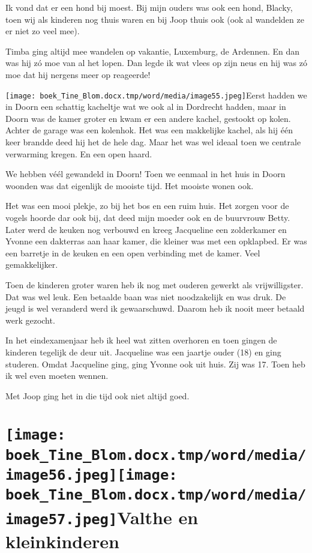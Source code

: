 \documentclass{scrbook}
\begin{document}
{Ik vond dat er een hond bij moest. Bij mijn ouders was ook een hond, Blacky, toen wij als kinderen nog thuis waren en bij Joop thuis ook (ook al wandelden ze er niet zo veel mee).

Timba ging altijd mee wandelen op vakantie, Luxemburg, de Ardennen. En dan was hij z\'{o} moe van al het lopen. Dan legde ik wat vlees op zijn neus en hij was z\'{o} moe dat hij nergens meer op reageerde!

\texttt{[image: boek\_Tine\_Blom.docx.tmp/word/media/image55.jpeg]}Eerst hadden we in Doorn een schattig kacheltje wat we ook al in Dordrecht hadden, maar in Doorn was de kamer groter en kwam er een andere kachel, gestookt op kolen. Achter de garage was een kolenhok. Het was een makkelijke kachel, als hij \'{e}\'{e}n keer brandde deed hij het de hele dag. Maar het was wel ideaal toen we centrale verwarming kregen. En een open haard.

We hebben v\'{e}\'{e}l gewandeld in Doorn! Toen we eenmaal in het huis in Doorn woonden was dat eigenlijk de mooiste tijd. Het mooiste wonen ook. 

Het was een mooi plekje, zo bij het bos en een ruim huis. Het zorgen voor de vogels hoorde dar ook bij, dat deed mijn moeder ook en de buurvrouw Betty. Later werd de keuken nog verbouwd en kreeg Jacqueline een zolderkamer en Yvonne een dakterras aan haar kamer, die kleiner was met een opklapbed. Er was een barretje in de keuken en een open verbinding met de kamer. Veel gemakkelijker.

Toen de kinderen groter waren heb ik nog met ouderen gewerkt als vrijwilligster. Dat was wel leuk. Een betaalde baan was niet noodzakelijk en was druk. De jeugd is wel veranderd werd ik gewaarschuwd. Daarom heb ik nooit meer betaald werk gezocht.

In het eindexamenjaar heb ik heel wat zitten overhoren en toen gingen de kinderen tegelijk de deur uit. Jacqueline was een jaartje ouder (18) en ging studeren. Omdat Jacqueline ging, ging Yvonne ook uit huis. Zij was 17. Toen heb ik wel even moeten wennen. 

Met Joop ging het in die tijd ook niet altijd goed.

\chapter{\label{ref-012}\texttt{[image: boek\_Tine\_Blom.docx.tmp/word/media/image56.jpeg]}\texttt{[image: boek\_Tine\_Blom.docx.tmp/word/media/image57.jpeg]}Valthe en kleinkinderen}

}
\end{document}
